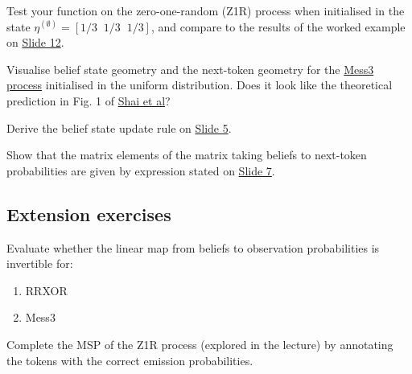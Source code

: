 \documentclass[11pt]{article}
\begin{document}
\begin{exercise}
\label{ex:pred-core-2}
Test your function on the zero-one-random (Z1R) process when initialised in the state \(\eta^{(\emptyset)} = [1/3\;\;1/3\;\;1/3]\), and compare to the results of the worked example on \href{https://drive.google.com/file/d/1IPz8Pq939VbjmVqYcYDybdJ02yvdgMGS/view?usp=sharing}{Slide 12}.
\end{exercise}

\begin{exercise}
\label{ex:pred-core-3}
Visualise belief state geometry and the next-token geometry for the \href{https://github.com/Astera-org/simplexity/blob/main/simplexity/generative_processes/transition_matrices.py}{Mess3 process} initialised in the uniform distribution. Does it look like the theoretical prediction in Fig. 1 of \href{https://arxiv.org/pdf/2405.15943}{Shai et al}?
\end{exercise}

\begin{exercise}
\label{ex:pred-core-4}
Derive the belief state update rule on \href{https://drive.google.com/file/d/1IPz8Pq939VbjmVqYcYDybdJ02yvdgMGS/view?usp=sharing}{Slide 5}.
\end{exercise}

\begin{exercise}
\label{ex:pred-core-5}
Show that the matrix elements of the matrix taking beliefs to next-token probabilities are given by expression stated on \href{https://drive.google.com/file/d/1IPz8Pq939VbjmVqYcYDybdJ02yvdgMGS/view?usp=sharing}{Slide 7}.
\end{exercise}

\subsection{Extension exercises}\label{sec:pred-ext}

\begin{exercise}
\label{ex:pred-ext-1}
Evaluate whether the linear map from beliefs to observation probabilities is invertible for:

\begin{enumerate}
\item
  RRXOR
\item
  Mess3
\end{enumerate}
\end{exercise}

\begin{exercise}
\label{ex:pred-ext-2}
Complete the MSP of the Z1R process (explored in the lecture) by annotating the tokens with the correct emission probabilities.
\end{exercise}
\end{document}
